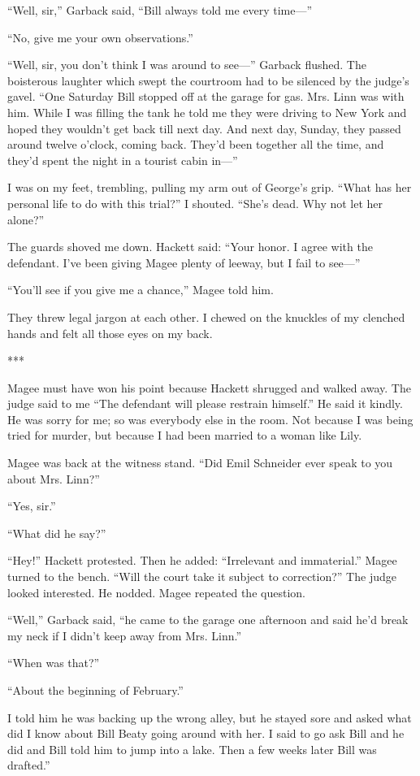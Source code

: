 {“Well, sir,” Garback said, “Bill always told me every time—”

“No, give me your own observations.”

“Well, sir, you don’t think I was around to see—” Garback flushed. The boisterous laughter which swept the courtroom had to be silenced by the judge’s gavel. “One Saturday Bill stopped off at the garage for gas. Mrs. Linn was with him. While I was filling the tank he told me they were driving to New York and hoped they wouldn’t get back till next day. And next day, Sunday, they passed around twelve o’clock, coming back. They’d been together all the time, and they’d spent the night in a tourist cabin in—”

I was on my feet, trembling, pulling my arm out of George’s grip. “What has her personal life to do with this trial?” I shouted. “She’s dead. Why not let her alone?”

The guards shoved me down. Hackett said: “Your honor. I agree with the defendant. I’ve been giving Magee plenty of leeway, but I fail to see—”

“You’ll see if you give me a chance,” Magee told him.

They threw legal jargon at each other. I chewed on the knuckles of my clenched hands and felt all those eyes on my back.

***

Magee must have won his point because Hackett shrugged and walked away. The judge said to me “The defendant will please restrain himself.” He said it kindly. He was sorry for me; so was everybody else in the room. Not because I was being tried for murder, but because I had been married to a woman like Lily.

Magee was back at the witness stand. “Did Emil Schneider ever speak to you about Mrs. Linn?”

“Yes, sir.”

“What did he say?”

“Hey!” Hackett protested. Then he added: “Irrelevant and immaterial.” Magee turned to the bench. “Will the court take it subject to correction?” The judge looked interested. He nodded. Magee repeated the question.

“Well,” Garback said, “he came to the garage one afternoon and said he’d break my neck if I didn’t keep away from Mrs. Linn.”

“When was that?”

“About the beginning of February.”

I told him he was backing up the wrong alley, but he stayed sore and asked what did I know about Bill Beaty going around with her. I said to go ask Bill and he did and Bill told him to jump into a lake. Then a few weeks later Bill was drafted.”

}
